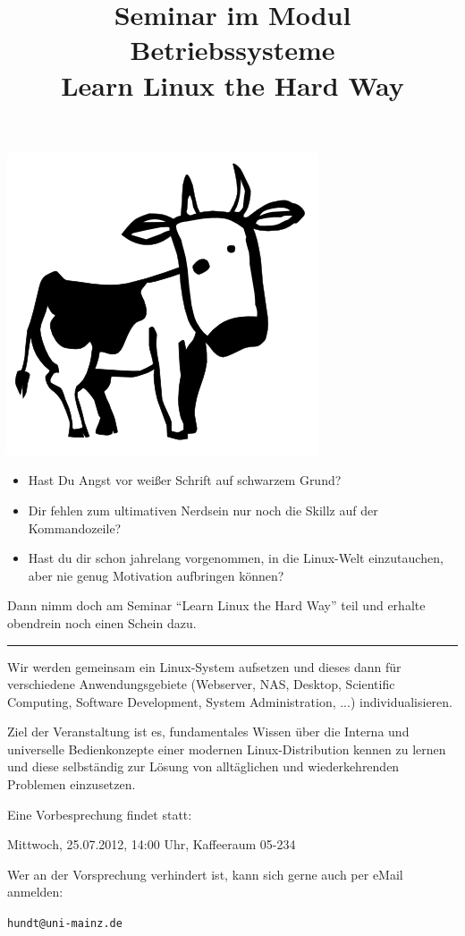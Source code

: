 \documentclass[a4paper]{scrartcl}
\title{{\Large Seminar im Modul Betriebssysteme}\\
    Learn Linux the Hard Way}
\author{}
\date{}
\begin{document}
\maketitle
\vspace{-50pt}
\begin{center}
\includegraphics[scale=0.45]{media/larry_the_cow-full.png}
\end{center}


\begin{itemize}
    \item Hast Du Angst vor weißer Schrift auf schwarzem Grund?
    \item Dir fehlen zum ultimativen Nerdsein nur noch die Skillz auf der  Kommandozeile?
    \item Hast du dir schon jahrelang vorgenommen, in die Linux-Welt einzutauchen, aber nie genug Motivation aufbringen können?
\end{itemize}

Dann nimm doch am Seminar ``Learn Linux the Hard Way'' teil und erhalte obendrein noch einen Schein dazu.

\rule{\columnwidth}{0.4pt}

Wir werden gemeinsam ein Linux-System aufsetzen und dieses dann für verschiedene Anwendungsgebiete (Webserver, NAS, Desktop, Scientific Computing, Software Development, System Administration, ...) individualisieren.

Ziel der Veranstaltung ist es, fundamentales Wissen über die Interna und universelle Bedienkonzepte einer modernen Linux-Distribution kennen zu lernen und diese selbständig zur Lösung von alltäglichen und wiederkehrenden Problemen einzusetzen.

\begin{center}
    Eine Vorbesprechung findet statt:
    
    \begin{LARGE}
        Mittwoch, 25.07.2012, 14:00 Uhr, Kaffeeraum 05-234
    \end{LARGE}

\end{center}

Wer an der Vorsprechung verhindert ist, kann sich gerne auch per eMail anmelden:
\begin{center}
\texttt{hundt@uni-mainz.de}
\end{center}
\end{document}
